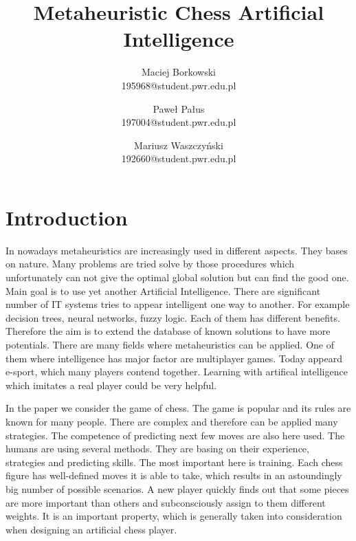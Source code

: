 \documentclass[pdftex]{article}
\date{}
\title{Metaheuristic Chess Artificial Intelligence}
\author{Maciej Borkowski\\ 195968@student.pwr.edu.pl \and Paweł Pałus\\ 197004@student.pwr.edu.pl  \and Mariusz Waszczyński\\  192660@student.pwr.edu.pl }
\begin{document}
\thispagestyle{empty}

\section{Introduction}
\label{sec:introduction}

In nowadays metaheuristics are increasingly used in different aspects. They bases on nature. Many problems are tried solve by those procedures which unfortunately can not give the optimal global solution but can find the good one. Main goal is to use yet another Artificial Intelligence. There are significant number of IT systems tries to appear intelligent one way to another. For example decision trees, neural networks, fuzzy logic. Each of them has different benefits. Therefore the aim is to extend the database of known solutions to have more potentials. There are many fields where metaheuristics can be applied. One of them where intelligence has major factor are multiplayer games. Today appeard e-sport, which many players contend together. Learning with artifical intelligence which imitates a real player could be very helpful. 

In the paper we consider the game of chess. The game is popular and its rules are known for many people. There are complex and therefore can be applied many strategies. The competence of predicting next few moves are also here used. The humans are using several methods. They are basing on their experience, strategies and predicting skills.
The most important here is training. Each chess figure has well-defined moves it is able to take, which results in an astoundingly big number of possible scenarios. A new player quickly finds out that some pieces are more important than others and subconsciously assign to them different weights. It is an important property, which is generally taken into consideration when designing an artificial chess player.~\cite{comparison}
\end{document}

